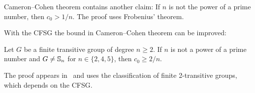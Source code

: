 Cameron--Cohen theorem contains another claim: If
$n$ is not the power of a prime number, then 
$c_0>1/n$. The proof uses Frobenius' theorem. 

With the CFSG the bound in 
Cameron--Cohen theorem can be improved:

\begin{theorem}
    Let $G$ be a finite transitive group of degree $n\geq2$. If $n$ 
    is not a power of a prime number and 
    $G\ne\mathbb{S}_n$ for $n\in\{2,4,5\}$, then $c_0\geq 2/n$.
\end{theorem}

The proof appears in~\cite{MR1484879} and uses
the classification of finite 2-transitive groups, 
which depends on the CFSG. 



